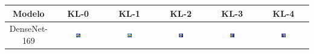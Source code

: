 \begin{table}
    \centering
    \begin{tabular}{|c|c|c|c|c|c|}
        \hline
        \textbf{Modelo} & \textbf{KL-0} & \textbf{KL-1} & \textbf{KL-2} & \textbf{KL-3} & \textbf{KL-4} \\ \hline
        DenseNet-169 & \includegraphics[width=0.15\textwidth]{figs/gradcams/gradcam_densenet169_kl0.png} & \includegraphics[width=0.15\textwidth]{figs/gradcams/gradcam_densenet169_kl1.png} & \includegraphics[width=0.15\textwidth]{figs/gradcams/gradcam_densenet169_kl2.png} & \includegraphics[width=0.15\textwidth]{figs/gradcams/gradcam_densenet169_kl3.png} & \includegraphics[width=0.15\textwidth]{figs/gradcams/gradcam_densenet169_kl4.png} \\ \hline

\end{tabular}
\end{table}
